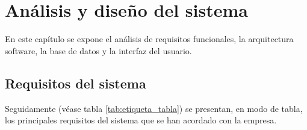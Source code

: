 \chapter{Análisis y diseño del sistema}

En este capítulo se expone el análisis de requisitos funcionales, la arquitectura software, la base de datos y la interfaz del usuario.

\section{Requisitos del sistema}

Seguidamente (véase tabla \ref{tab:etiqueta_tabla}) se presentan, en modo de tabla, los principales requisitos del sistema que se han acordado con la empresa.


